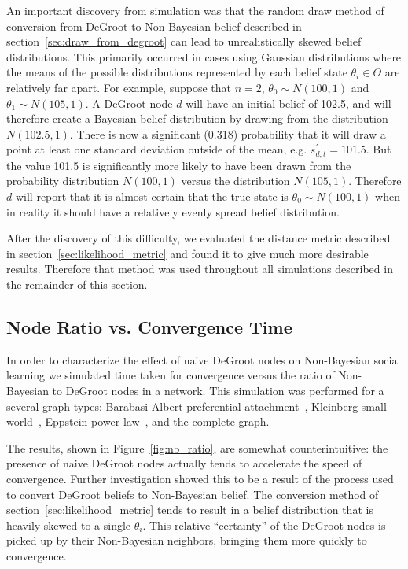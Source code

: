 \documentclass[letterpaper, 11pt, conference]{ieeeconf}
\begin{document}
An important discovery from simulation was that the random draw method of conversion from DeGroot to Non-Bayesian belief described in section~\ref{sec:draw_from_degroot} can lead to unrealistically skewed belief distributions.  This primarily occurred in cases using Gaussian distributions where the means of the possible distributions represented by each belief state $\theta_i \in \Theta$ are relatively far apart.  For example, suppose that $n = 2$, $\theta_0 \sim N(100, 1)$ and $\theta_1 \sim N(105, 1)$.  A DeGroot node $d$ will have an initial belief of 102.5, and will therefore create a Bayesian belief distribution by drawing from the distribution $N(102.5, 1)$.  There is now a significant (0.318) probability that it will draw a point at least one standard deviation outside of the mean, e.g. $s_{d,t}^\prime = 101.5$.  But the value 101.5 is significantly more likely to have been drawn from the probability distribution $N(100, 1)$ versus the distribution $N(105, 1)$.  Therefore $d$ will report that it is almost certain that the true state is $\theta_0 \sim N(100, 1)$ when in reality it should have a relatively evenly spread belief distribution.

After the discovery of this difficulty, we evaluated the distance metric described in section~\ref{sec:likelihood_metric} and found it to give much more desirable results.  Therefore that method was used throughout all simulations described in the remainder of this section.

\subsection{Node Ratio vs. Convergence Time}
\label{sec:node_ratio_vs_convergence_time}

In order to characterize the effect of naive DeGroot nodes on Non-Bayesian social learning we simulated time taken for convergence versus the ratio of Non-Bayesian to DeGroot nodes in a network.  This simulation was performed for a several graph types: Barabasi-Albert preferential attachment~\cite{Barabasi}, Kleinberg small-world~\cite{KleinbergSmallWorld}, Eppstein power law~\cite{Eppstein}, and the complete graph.  


The results, shown in Figure~\ref{fig:nb_ratio}, are somewhat counterintuitive: the presence of naive DeGroot nodes actually tends to accelerate the speed of convergence.  Further investigation showed this to be a result of the process used to convert DeGroot beliefs to Non-Bayesian belief.  The conversion method of section~\ref{sec:likelihood_metric} tends to result in a belief distribution that is heavily skewed to a single $\theta_i$.  This relative ``certainty'' of the DeGroot nodes is picked up by their Non-Bayesian neighbors, bringing them more quickly to convergence.
\end{document}
